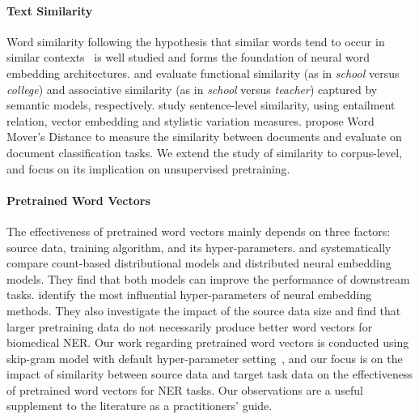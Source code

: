 \documentclass[11pt,a4paper]{article}
\begin{document}
\paragraph{Text Similarity} 
Word similarity following the hypothesis that similar words tend to occur in similar contexts~\citep{Harris:Word:1954} is well studied and forms the foundation of neural word embedding architectures. 
\citet{Hill:Reichart:CL:2015} and \citet{Budanitsky:Hirst:CL:2006} evaluate functional similarity (as in \emph{school} versus \emph{college}) and associative similarity (as in \emph{school} versus \emph{teacher}) captured by semantic models, respectively.
\citet{Pavlick:Rastogi:ACL:2015} study sentence-level similarity, using entailment relation, vector embedding and stylistic variation measures. 
\citet{Kusner:Sun:ICML:2015} propose Word Mover's Distance to measure the similarity between documents and evaluate on document classification tasks. 
We extend the study of similarity to corpus-level, and focus on its implication on unsupervised pretraining.

\paragraph{Pretrained Word Vectors}
The effectiveness of pretrained word vectors mainly depends on three factors: source data, training algorithm, and its hyper-parameters. 
\citet{Turian:Ratinov:ACL:2010} and \citet{Levy:Goldberg:TACL:2015} systematically compare count-based distributional models and distributed neural embedding models. 
They find that both models can improve the performance of downstream tasks.
\citet{Chiu:Crichton:BioNLP:2016} identify the most influential hyper-parameters of neural embedding methods. They also investigate the impact of the source data size and find that larger pretraining data do not necessarily produce better word vectors for biomedical NER. 
Our work regarding pretrained word vectors is conducted using skip-gram model with default hyper-parameter setting~\citep{Mikolov:Chen:arXiv:2013}, and our focus is on the impact of similarity between source data and target task data on the effectiveness of pretrained word vectors for NER tasks. 
Our observations are a useful supplement to the literature as a practitioners' guide.
\end{document}
